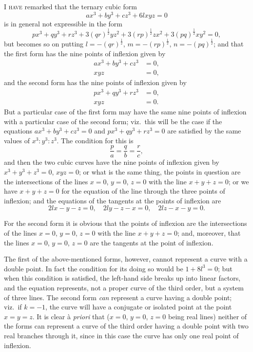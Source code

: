 \documentclass[11pt,a4paper]{book}
\begin{document}
\textsc{I have} remarked that the ternary cubic form
\[
ax^3 + by^3 + cz^3 + 6lxyz = 0
\]
is in general not expressible in the form
\[
px^3 + qy^3 + rz^3 + 3(qr)^{\frac{1}{2}}yz^2 + 3(rp)^{\frac{1}{2}}zx^2 + 3(pq)^{\frac{1}{2}}xy^2 = 0,
\]
but becomes so on putting $l = -(qr)^{\frac{1}{2}}$, $m = -(rp)^{\frac{1}{2}}$, $n = -(pq)^{\frac{1}{2}}$; and that the first form has the nine points of inflexion given by
\begin{align*}
ax^3 + by^3 + cz^3 &= 0, \\
xyz &= 0,
\end{align*}
and the second form has the nine points of inflexion given by
\begin{align*}
px^3 + qy^3 + rz^3 &= 0, \\
xyz &= 0.
\end{align*}
But a particular case of the first form may have the same nine points of inflexion with a particular case of the second form; viz.\ this will be the case if the equations $ax^3 + by^3 + cz^3 = 0$ and $px^3 + qy^3 + rz^3 = 0$ are satisfied by the same values of $x^3 : y^3 : z^3$. The condition for this is
\[
\frac{p}{a} = \frac{q}{b} = \frac{r}{c},
\]
and then the two cubic curves have the nine points of inflexion given by $x^3 + y^3 + z^3 = 0$, $xyz = 0$; or what is the same thing, the points in question are the intersections of the lines $x=0$, $y=0$, $z=0$ with the line $x+y+z=0$; or we have $x+y+z=0$ for the equation of the line through the three points of inflexion; and the equations of the tangents at the points of inflexion are
\[
2lx - y - z = 0, \quad 2ly - z - x = 0, \quad 2lz - x - y = 0.
\]

For the second form it is obvious that the points of inflexion are the intersections of the lines $x=0$, $y=0$, $z=0$ with the line $x+y+z=0$; and, moreover, that the lines $x=0$, $y=0$, $z=0$ are the tangents at the point of inflexion.

The first of the above-mentioned forms, however, cannot represent a curve with a double point. In fact the condition for its doing so would be $1 + 8l^3 = 0$; but when this condition is satisfied, the left-hand side breaks up into linear factors, and the equation represents, not a proper curve of the third order, but a system of three lines. The second form \textit{can} represent a curve having a double point; viz.\ if $k=-1$, the curve will have a conjugate or isolated point at the point $x=y=z$. It is clear \`{a} \textit{priori} that ($x=0$, $y=0$, $z=0$ being real lines) neither of the forms can represent a curve of the third order having a double point with two real branches through it, since in this case the curve has only one real point of inflexion.
\end{document}
